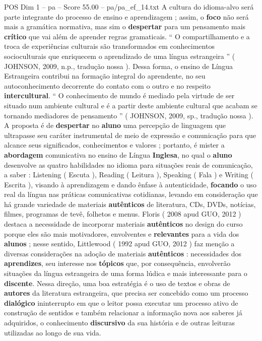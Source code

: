 \begin{textsample}{POS Dim 1 – pa – Score 55.00 – pa/pa\_ef\_14.txt}
A cultura do idioma-alvo será parte integrante do processo de ensino e aprendizagem ; assim, o \textbf{foco} não será mais a gramática normativa, mas sim o \textbf{despertar} para um pensamento mais \textbf{crítico} que vai além de aprender regras gramaticais. “ O compartilhamento e a troca de experiências culturais são transformados em conhecimentos socioculturais que enriquecem o aprendizado de uma língua estrangeira ” ( JOHNSON, 2009, n.p., tradução nossa ).
Dessa forma, o ensino de Língua Estrangeira contribui na formação integral do aprendente, no seu autoconhecimento decorrente do contato com o outro e no respeito \textbf{intercultural}. “ O conhecimento de mundo é mediado pela virtude de ser situado num ambiente cultural e é a partir deste ambiente cultural que acabam se tornando mediadores de pensamento ” ( JOHNSON, 2009, sp., tradução nossa ).
A proposta é de \textbf{despertar} no \textbf{aluno} uma percepção de linguagem que ultrapasse seu caráter instrumental de meio de expressão e comunicação para que alcance seus significados, conhecimentos e valores ; portanto, é mister a \textbf{abordagem} comunicativa no ensino de Língua \textbf{Inglesa}, no qual o \textbf{aluno} desenvolve as quatro habilidades no idioma para situações reais de comunicação, a saber : Listening ( Escuta ), Reading ( Leitura ), Speaking ( Fala ) e Writing ( Escrita ), visando à aprendizagem e dando ênfase à autenticidade, \textbf{focando} o uso real da língua nas práticas comunicativas cotidianas, levando em consideração que há grande variedade de materiais \textbf{autênticos} de literatura, CDs, DVDs, notícias, filmes, programas de tevê, folhetos e menus.
Floris ( 2008 apud GUO, 2012 ) destaca a necessidade de incorporar materiais \textbf{autênticos} no design do curso porque eles são mais motivadores, envolventes e \textbf{relevantes} para a vida dos \textbf{alunos} ; nesse sentido, Littlewood ( 1992 apud GUO, 2012 ) faz menção a diversas considerações na adoção de materiais \textbf{autênticos} : necessidades dos \textbf{aprendizes}, seu interesse nos \textbf{tópicos} que, por consequência, envolverão situações da língua estrangeira de uma forma lúdica e mais interessante para o \textbf{discente}.
Nessa direção, uma boa estratégia é o uso de textos e obras de \textbf{autores} da literatura estrangeira, que precisa ser concebido como um processo \textbf{dialógico} ininterrupto em que o leitor possa executar um processo ativo de construção de sentidos e também relacionar a informação nova aos saberes já adquiridos, o conhecimento \textbf{discursivo} da sua história e de outras leituras utilizadas ao longo de sua vida.

\end{textsample}
